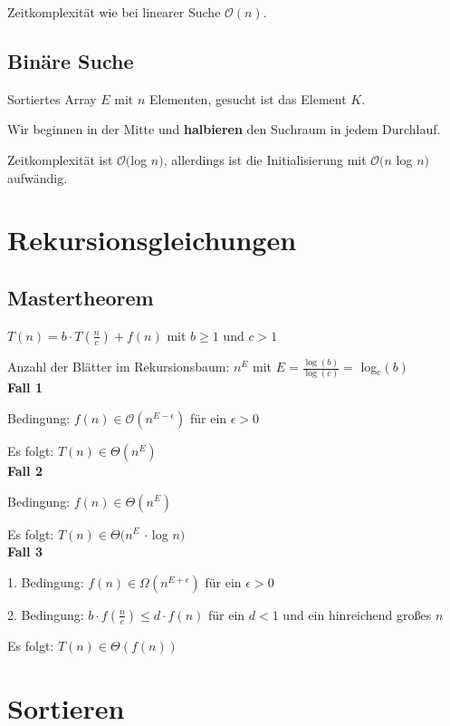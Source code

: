 \documentclass[12pt]{article}
\begin{document}
Zeitkomplexität wie bei linearer Suche $\mathcal O(n)$.

\subsection{Binäre Suche}

Sortiertes Array $E$ mit $n$ Elementen, gesucht ist das Element $K$.

Wir beginnen in der Mitte und \textbf{halbieren} den Suchraum in jedem Durchlauf.

Zeitkomplexität ist $\mathcal O($log $n)$, allerdings ist die Initialisierung mit $\mathcal O(n $ log $ n)$ aufwändig.

\section{Rekursionsgleichungen}

\subsection{Mastertheorem}

$T(n) = b \cdot{} T(\frac{n}{c}) + f(n)$ mit $b \geq 1$ und $c > 1$

Anzahl der Blätter im Rekursionsbaum: $n^E$ mit $E = \frac{\log(b)}{\log(c)} = $ log$_c(b)$\\

\textbf{Fall 1}

Bedingung: $f(n) \in \mathcal O(n^{E-\epsilon})$ für ein $\epsilon > 0$

Es folgt: $T(n) \in \Theta(n^E)$\\

\textbf{Fall 2}

Bedingung: $f(n) \in \Theta(n^{E})$

Es folgt: $T(n) \in \Theta(n^E$ $\cdot{}$ log $n)$\\

\textbf{Fall 3}

1. Bedingung: $f(n) \in \Omega(n^{E+\epsilon})$ für ein $\epsilon > 0$

2. Bedingung: $b\cdot{}f(\frac{n}{c}) \leq d \cdot{} f(n)$ für ein $d < 1$ und ein hinreichend großes $n$

Es folgt: $T(n) \in \Theta(f(n))$

\section{Sortieren}
\end{document}
